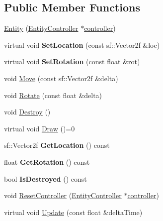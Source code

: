 \subsection*{Public Member Functions}
\begin{DoxyCompactItemize}
\item 
\mbox{\hyperlink{class_entity_ab076af15dcbbda1a1f6ef0da746919fb}{Entity}} (\mbox{\hyperlink{class_entity_controller}{Entity\+Controller}} $\ast$\mbox{\hyperlink{class_entity_aae95fabac07322ac31d03b582f74f393}{controller}})
\item 
\mbox{\label{class_entity_a416ff8839e6a72e40ee3bc0f33d4d8da}} 
virtual void {\bfseries Set\+Location} (const sf\+::\+Vector2f \&loc)
\item 
\mbox{\label{class_entity_aeb5e6b872db402526299469a04155ea3}} 
virtual void {\bfseries Set\+Rotation} (const float \&rot)
\item 
void \mbox{\hyperlink{class_entity_ad605eeb16d800831fcf70b3a5be2da2d}{Move}} (const sf\+::\+Vector2f \&delta)
\item 
void \mbox{\hyperlink{class_entity_a78a4083bdd81fc24365f7bb86e291425}{Rotate}} (const float \&delta)
\item 
void \mbox{\hyperlink{class_entity_aa75151fc607686b42d27f8c3ba73143d}{Destroy}} ()
\item 
virtual void \mbox{\hyperlink{class_entity_a1d006ae3028ba4ddfc9b4f202ccddf55}{Draw}} ()=0
\item 
\mbox{\label{class_entity_a5bc4d9114f5b5e75aed51d2fc36b43d0}} 
sf\+::\+Vector2f {\bfseries Get\+Location} () const
\item 
\mbox{\label{class_entity_ab5e5cf79cf2ce961c23061798488bcc4}} 
float {\bfseries Get\+Rotation} () const
\item 
\mbox{\label{class_entity_a3afc67113faa29277200f9f368614d4e}} 
bool {\bfseries Is\+Destroyed} () const
\item 
void \mbox{\hyperlink{class_entity_a11c74ff6a08f126fa0f1f927dba215d3}{Reset\+Controller}} (\mbox{\hyperlink{class_entity_controller}{Entity\+Controller}} $\ast$\mbox{\hyperlink{class_entity_aae95fabac07322ac31d03b582f74f393}{controller}})
\item 
virtual void \mbox{\hyperlink{class_entity_a87a4695d4f5ca340346e2e44b2fdb26a}{Update}} (const float \&delta\+Time)
\end{DoxyCompactItemize}
